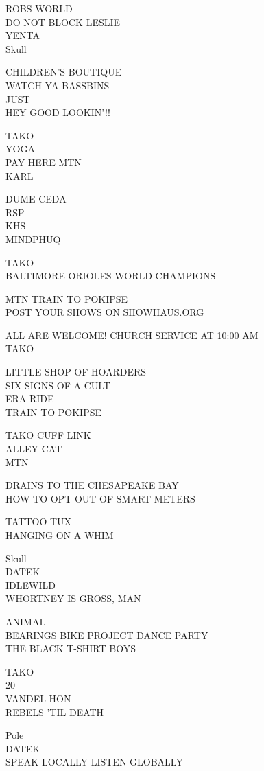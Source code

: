 \documentclass[10pt,letterpaper]{article}
\begin{document}
ROBS WORLD\\
DO NOT BLOCK LESLIE\\
YENTA\\
Skull

CHILDREN'S BOUTIQUE\\
WATCH YA BASSBINS\\
JUST\\
HEY GOOD LOOKIN'!!

TAKO\\
YOGA\\
PAY HERE MTN\\
KARL

DUME CEDA\\
RSP\\
KHS\\
MINDPHUQ

TAKO\\
BALTIMORE ORIOLES WORLD CHAMPIONS

MTN TRAIN TO POKIPSE\\
POST YOUR SHOWS ON SHOWHAUS.ORG

ALL ARE WELCOME! CHURCH SERVICE AT 10:00 AM\\
TAKO

LITTLE SHOP OF HOARDERS\\
SIX SIGNS OF A CULT\\
ERA RIDE\\
TRAIN TO POKIPSE

TAKO CUFF LINK\\
ALLEY CAT\\
MTN

DRAINS TO THE CHESAPEAKE BAY\\
HOW TO OPT OUT OF SMART METERS

TATTOO TUX\\
HANGING ON A WHIM

Skull\\
DATEK\\
IDLEWILD\\
WHORTNEY IS GROSS, MAN

ANIMAL\\
BEARINGS BIKE PROJECT DANCE PARTY\\
THE BLACK T{-}SHIRT BOYS

TAKO\\
20\\
VANDEL HON\\
REBELS 'TIL DEATH

Pole\\
DATEK\\
SPEAK LOCALLY LISTEN GLOBALLY
\end{document}
